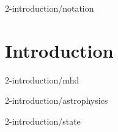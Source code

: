 \tableofcontents

 {2-introduction/notation}

\chapter{Introduction}
\setcounter{page}{1}

 {2-introduction/mhd}

 {2-introduction/astrophysics}

 {2-introduction/state}